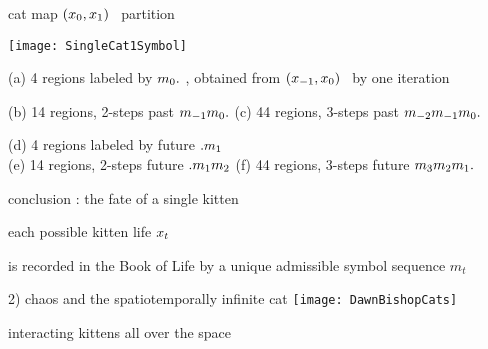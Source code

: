 \begin{frame}{cat map $(x_{0},x_{1})$  \statesp\ partition}
\begin{center}
	\texttt{[image: SingleCat1Symbol]}
\end{center}

{\scriptsize
(a) 4 regions labeled by ${m_{0}}.$ , obtained from
$(x_{-1},x_{0})$ \statesp\ by one iteration

\medskip

(b) 14 regions, 2-steps past ${m_{-1}}{m_{0}}.$
\quad (c) 44 regions, 3-steps past ${m_{-2}}{m_{-1}}{m_{0}}.$

\medskip

(d) 4 regions labeled by future $.{m_{1}}$
\\
(e) 14 regions, 2-steps  future $.{m_{1}}{m_{2}}$
\quad (f) 44 regions, 3-steps future {\brick} ${m_{3}}{m_{2}}{m_{1}}.$
}
\end{frame}

\begin{frame}{conclusion : the fate of a single kitten} %

each possible kitten life $x_t$

\vfill
is recorded in the Book of Life by a unique admissible symbol sequence $m_t$
\end{frame}


\begin{frame}{2) chaos and the spatiotemporally infinite cat}
\hfill\texttt{[image: DawnBishopCats]}

interacting kittens all over the space
\end{frame}


